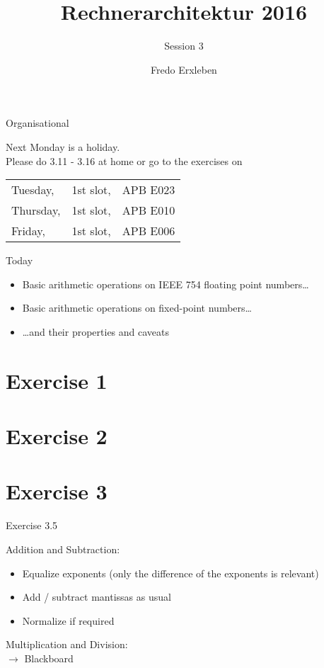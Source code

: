 \documentclass[11pt]{tudbeamer}
\title{Rechnerarchitektur 2016}
\subtitle{Session 3}
\author{Fredo Erxleben}
\begin{document}
  \maketitle

\begin{frame}{Organisational}

	Next Monday is a holiday.\\
	Please do 3.11 - 3.16 at home or go to the exercises on

	\begin{tabular}{lcc}
		Tuesday, 	&1st slot, &APB E023\\
		Thursday, 	&1st slot, &APB E010\\
		Friday, 		&1st slot, &APB E006\\
	\end{tabular}

\end{frame}

\begin{frame}{Today}

	\begin{itemize}
		\item Basic arithmetic operations on IEEE 754 floating point numbers\dots
		\item Basic arithmetic operations on fixed-point numbers\dots
		\item \dots and their properties and caveats
	\end{itemize} 

\end{frame}

\section{Exercise 1}
\section{Exercise 2}
\section{Exercise 3}

\begin{frame}[allowframebreaks]{Exercise 3.5}

	Addition and Subtraction:\\

	\begin{itemize}
		\item Equalize exponents (only the difference of the exponents is relevant)
		\item Add / subtract mantissas as usual
		\item Normalize if required
	\end{itemize}

\framebreak

	Multiplication and Division: \\
	$\rightarrow$ Blackboard
\end{frame}
\end{document}
